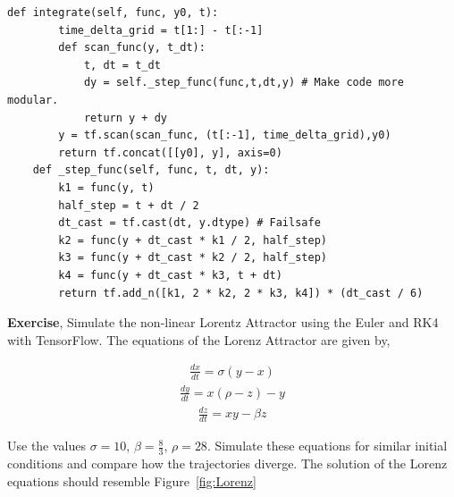 \documentclass[10pt,letterpaper]{article}
\begin{document}
\begin{nolinenumbers}
\begin{verbatim}
def integrate(self, func, y0, t): 
        time_delta_grid = t[1:] - t[:-1]
        def scan_func(y, t_dt): 
            t, dt = t_dt
            dy = self._step_func(func,t,dt,y) # Make code more modular.
            return y + dy
        y = tf.scan(scan_func, (t[:-1], time_delta_grid),y0)
        return tf.concat([[y0], y], axis=0)
    def _step_func(self, func, t, dt, y):
        k1 = func(y, t)
        half_step = t + dt / 2
        dt_cast = tf.cast(dt, y.dtype) # Failsafe
        k2 = func(y + dt_cast * k1 / 2, half_step)
        k3 = func(y + dt_cast * k2 / 2, half_step)
        k4 = func(y + dt_cast * k3, t + dt)
        return tf.add_n([k1, 2 * k2, 2 * k3, k4]) * (dt_cast / 6)
\end{verbatim}

\textbf{Exercise}, Simulate the non-linear Lorentz Attractor using the Euler and RK4 with TensorFlow. The equations of the Lorenz Attractor are given by,

\begin{eqnarray}\frac{dx}{dt}=\sigma(y-x) \end{eqnarray}
\begin{eqnarray}\frac{dy}{dt}=x(\rho-z)-y \end{eqnarray}
\begin{eqnarray}\frac{dz}{dt}=xy-\beta z \end{eqnarray}

Use the values $\sigma =10$, $\beta =\frac{8}{3}$, $\rho =28$. Simulate these equations for similar initial conditions and compare how the trajectories diverge. The solution of the Lorenz equations should resemble Figure~\ref{fig:Lorenz}
 

\end{nolinenumbers}
\end{document}
